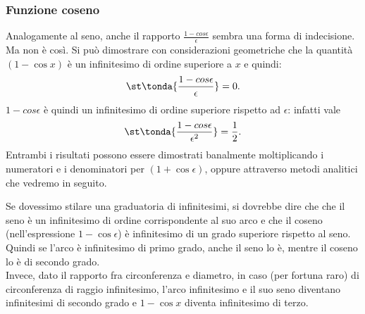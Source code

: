 \subsubsection{Funzione coseno}
\label{subsubsec:insnum_fcoseno}
Analogamente al seno, anche il rapporto \(\frac{1-cos \epsilon}{\epsilon}\)
sembra una forma di indecisione. 
Ma non è così. Si può dimostrare con considerazioni geometriche che 
la quantità $(1-\cos x)$ è un infinitesimo di ordine superiore a 
$x$ e quindi:
\[
 \st\tonda{\frac{1-cos \epsilon}{\epsilon}}=0.
\]
$1-cos \epsilon$ è quindi un infinitesimo di ordine superiore rispetto ad 
$\epsilon$: infatti vale
\[
 \st\tonda{\frac{1-cos \epsilon}{\epsilon^2}}=\frac{1}{2}.
\]
Entrambi i risultati possono essere dimostrati banalmente moltiplicando i 
numeratori e i denominatori per $(1+\cos \epsilon)$, oppure attraverso 
metodi analitici che vedremo in seguito.

\begin{osservazione}
Se dovessimo stilare una graduatoria di infinitesimi, si dovrebbe dire che 
che il seno è un infinitesimo di ordine corrispondente al suo arco e che il 
coseno
(nell'espressione $1-\cos \epsilon$) è infinitesimo di un grado superiore 
rispetto al seno.
Quindi se l'arco è infinitesimo di primo grado, anche il seno lo è, mentre
il coseno lo è di secondo grado.\\
Invece, dato il rapporto fra circonferenza e diametro, in caso (per fortuna 
raro) di circonferenza di raggio infinitesimo, l'arco infinitesimo e il 
suo seno diventano infinitesimi di secondo grado e $1-\cos x$ diventa 
infinitesimo di terzo.
\end{osservazione}

